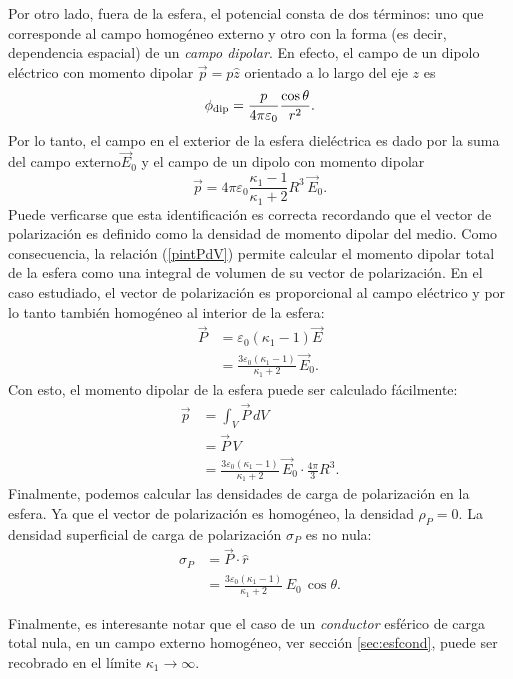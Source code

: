 Por otro lado, fuera de la esfera, el potencial consta de dos términos: uno que corresponde al campo homogéneo externo y otro con la forma (es decir, dependencia espacial) de un \textit{campo dipolar}. En efecto, el campo de un dipolo eléctrico con momento dipolar $\vec{p}=p\hat{z}$ orientado a lo largo del eje $z$ es
 \begin{equation}
 \phi_{\rm dip}=\frac{p}{4\pi\varepsilon_0}\frac{\cos\theta}{r^2}.
 \end{equation}
Por lo tanto, el campo en el exterior de la esfera dieléctrica es dado por la suma del campo externo$\vec{E}_0$ y el campo de un dipolo con momento dipolar
 \begin{equation}
\vec{p}=4\pi\varepsilon_0\frac{\kappa_1-1}{\kappa_1+2}R^3\,\vec{E}_0.
 \end{equation}
Puede verficarse que esta identificación es correcta recordando que el vector de polarización es definido como la densidad de momento dipolar del medio. Como consecuencia, la relación (\ref{pintPdV}) permite calcular el momento dipolar total de la esfera como una integral de volumen de su vector de polarización. En el caso estudiado, el vector de polarización es proporcional al campo eléctrico y por lo tanto también homogéneo al interior de la esfera:
\begin{align}
\vec{P} &= \varepsilon_0(\kappa_1-1)\vec{E} \\
&= \frac{3\varepsilon_0(\kappa_1-1)}{\kappa_1+2}\,\vec{E}_0.
\end{align}
Con esto, el momento dipolar de la esfera puede ser calculado fácilmente:
\begin{align}
\vec{p} &= \int_V \vec{P}\,dV \\
&= \vec{P}\,V \\
&= \frac{3\varepsilon_0(\kappa_1-1)}{\kappa_1+2}\,\vec{E}_0\cdot \frac{4\pi}{3}R^3.
\end{align}
Finalmente, podemos calcular las densidades de carga de polarización en la esfera. Ya que el vector de polarización es homogéneo, la densidad $\rho_P=0$. La densidad superficial de carga de polarización $\sigma_P$ es no nula:
\begin{align}
\sigma_P &= \vec{P}\cdot\hat{r}\\
&= \frac{3\varepsilon_0(\kappa_1-1)}{\kappa_1+2}\,E_0\,\cos\theta.
\end{align}

Finalmente, es interesante notar que el caso de un \textit{conductor} esférico de carga total nula, en un campo externo homogéneo, ver sección \ref{sec:esfcond}, puede ser recobrado en el límite $\kappa_1\to\infty$.

